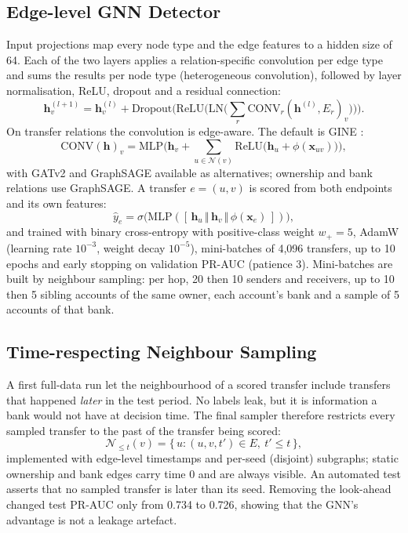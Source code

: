 \subsection{Edge-level GNN Detector}
Input projections map every node type and the edge features to a hidden size of 64. Each of the two layers applies a relation-specific convolution per edge type and sums the results per node type (heterogeneous convolution), followed by layer normalisation, ReLU, dropout and a residual connection:
\begin{equation}
\mathbf{h}_v^{(l+1)} = \mathbf{h}_v^{(l)} + \mathrm{Dropout}\Big(\mathrm{ReLU}\big(\mathrm{LN}\big(\textstyle\sum_{r} \mathrm{CONV}_r(\mathbf{h}^{(l)}, E_r)_v\big)\big)\Big).
\end{equation}
On transfer relations the convolution is edge-aware. The default is GINE \cite{hu2020strategies}:
\begin{equation}
\mathrm{CONV}(\mathbf{h})_v = \mathrm{MLP}\Big(\mathbf{h}_v + \sum_{u \in \mathcal{N}(v)} \mathrm{ReLU}\big(\mathbf{h}_u + \phi(\mathbf{x}_{uv})\big)\Big),
\end{equation}
with GATv2 \cite{brody2022attentive} and GraphSAGE \cite{hamilton2017inductive} available as alternatives; ownership and bank relations use GraphSAGE. A transfer $e=(u,v)$ is scored from both endpoints and its own features:
\begin{equation}
\hat{y}_e = \sigma\big(\mathrm{MLP}([\,\mathbf{h}_u \,\Vert\, \mathbf{h}_v \,\Vert\, \phi(\mathbf{x}_e)\,])\big),
\end{equation}
and trained with binary cross-entropy with positive-class weight $w_+=5$, AdamW (learning rate $10^{-3}$, weight decay $10^{-5}$), mini-batches of 4,096 transfers, up to 10 epochs and early stopping on validation PR-AUC (patience 3). Mini-batches are built by neighbour sampling: per hop, 20 then 10 senders and receivers, up to 10 then 5 sibling accounts of the same owner, each account's bank and a sample of 5 accounts of that bank.

\subsection{Time-respecting Neighbour Sampling}
A first full-data run let the neighbourhood of a scored transfer include transfers that happened \emph{later} in the test period. No labels leak, but it is information a bank would not have at decision time. The final sampler therefore restricts every sampled transfer to the past of the transfer being scored:
\begin{equation}
\mathcal{N}_{\le t}(v) = \{\, u : (u,v,t') \in E,\ t' \le t \,\},
\end{equation}
implemented with edge-level timestamps and per-seed (disjoint) subgraphs; static ownership and bank edges carry time 0 and are always visible. An automated test asserts that no sampled transfer is later than its seed. Removing the look-ahead changed test PR-AUC only from 0.734 to 0.726, showing that the GNN's advantage is not a leakage artefact.

